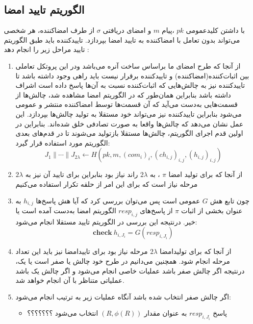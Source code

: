 \begin{itemize}
\subsection{الگوریتم تایید امضا}\label{algorithm_verify_signature}
 با داشتن کلیدعمومی
$pk$
،پیام
$m$
و امضای دریافتی 
$\sigma$
از طرف امضاکننده، هر شخصی می‌تواند بدون تعامل با امضاکننده به تایید امضا بپردازد. تاییدکننده باید طبق الگوریتم تایید مراحل زیر را انجام دهد :
\begin{enumerate}
	\item { 
  از آنجا که طرح امضای ما براساس ساخت آنره می‌باشد ودر این پروتکل تعاملی بین 
  اثبات‌کننده(امضاکننده) و تاییدکننده برقرار نیست باید راهی وجود داشته باشد تا تاییدکننده نیز به چالش‌هایی که اثبات‌کننده نسبت به آن‌ها پاسخ داده است اشراف داشته باشد بنابراین همان‌طور که در الگوریتم امضا مشاهده شد، چالش‌ها از قسمت‌هایی به‌دست می‌آید که آن قسمت‌ها توسط امضاکننده منتشر و عمومی می‌شود بنابراین تاییدکننده نیز می‌تواند خود مستقلا به تولید چالش‌ها بپردازد. این عمل نشان می‌دهد که چالش‌ها واقعا به صورت تصادفی خلق شده‌اند.
  بنابراین در اولین قدم اجرای الگوریتم، چالش‌ها مستقلا بازتولید می‌شوند تا در قدم‌های بعدی الگوریتم مورد استفاده قرار گیرد:
	$$ J_1 \parallel \cdots \parallel J_{2 \lambda} \leftarrow 
	H(pk , m , (com_i)_i , (ch_{i,j})_{i,j} , (h_{i,j})_{i,j} )
	$$
	}

	\item {
	از آنجا که برای تولید امضا
	$\pi$
	، به 
	$2\lambda$
	راند نیاز بود بنابراین برای تایید آن نیز به 
	$2\lambda$
	مرحله نیاز است که برای این امر از حلقه تکرار استفاده می‌کنیم
	}

	\item {
	چون تابع هش 
	$G$
	عمومی است پس می‌توان بررسی کرد که آیا هش پاسخ‌ها 
	$h_{i,j} $
	به عنوان بخشی از اثبات 
	$\pi$
	از پاسخ‌های 
	$resp_{i,j}$
	الگوریتم امضا به‌دست آمده است یا خیر. درنتیجه این بررسی در الگوریتم تایید مستقلا انجام می‌شود:
	$$ \textbf{check} ~ h_{i,J_i} = G(resp_{i,J_i})$$
	}

	\item {
	از آنجا که برای تولیدامضا 
	$2\lambda$
	مرحله نیاز بود برای تاییدامضا نیز باید این تعداد مرحله انجام شود. همچنین می‌دانیم در طرح خود چالش یا صفر است یا یک، درنتیجه اگر چالش صفر باشد عملیات خاصی انجام می‌شود و اگر چالش یک باشد عملیاتی متناظر با آن انجام خواهد شد.
	}
	\item {
	اگر چالش  صفر انتخاب شده باشد آنگاه عملیات زیر به ترتیب انجام می‌شود:
	\begin{itemize}
		\item {
		پاسخ
		$resp_{i,J_i}$
		به عنوان مقدار
		$(R,\phi(R))$
		انتخاب می‌شود ؟؟؟؟؟؟؟
		}
	

\end{itemize}}
\end{enumerate}
\end{itemize}
